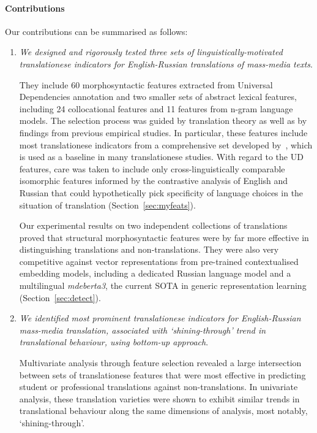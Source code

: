\paragraph{Contributions}
Our contributions can be summarised as follows: %
\begin{enumerate}\compresslist{}
	\item \textit{We designed and rigorously tested three sets of linguistically-motivated translationese indicators for English-Russian translations of mass-media texts}. 
	
	They include 60 morphosyntactic features extracted from Universal Dependencies annotation and two smaller sets of abstract lexical features, including 24 collocational features and 11 features from n-gram language models. The selection process was guided by translation theory as well as by findings from previous empirical studies. In particular, these features include most translationese indicators from a comprehensive set developed by~\citet{Volansky2015}, which is used as a baseline in many translationese studies. With regard to the UD features, care was taken to include only cross-linguistically comparable isomorphic features informed by the contrastive analysis of English and Russian that could hypothetically pick specificity of language choices in the situation of translation (Section~\ref{sec:myfeats}). 
	
	Our experimental results on two independent collections of translations proved that structural morphosyntactic features were by far more effective in distinguishing translations and non-translations. They were also very competitive against vector representations from pre-trained contextualised embedding models, including a dedicated Russian language model and a multilingual \textit{mdeberta3}, the current SOTA in generic representation learning (Section~\ref{sec:detect}).      
	
	\item \textit{We identified most prominent translationese indicators for English-Russian mass-media translation, associated with `shining-through' trend in translational behaviour, using bottom-up approach}. 
	
	Multivariate analysis through feature selection revealed a large intersection between sets of translationese features that were most effective in predicting student or professional translations against non-translations. In univariate analysis, these translation varieties were shown to exhibit similar trends in translational behaviour along the same dimensions of analysis, most notably, `shining-through'.
	

\end{enumerate}
